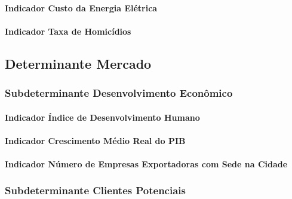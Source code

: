 \documentclass[
  12,
  dvipsnames]{article}
\begin{document}
\hypertarget{indicador-custo-da-energia-eluxe9trica}{%
\paragraph{Indicador Custo da Energia
Elétrica}\label{indicador-custo-da-energia-eluxe9trica}}

\hypertarget{indicador-taxa-de-homicuxeddios}{%
\paragraph{Indicador Taxa de
Homicídios}\label{indicador-taxa-de-homicuxeddios}}

\hypertarget{determinante-mercado}{%
\subsection{Determinante Mercado}\label{determinante-mercado}}

\hypertarget{subdeterminante-desenvolvimento-econuxf4mico}{%
\subsubsection{Subdeterminante Desenvolvimento
Econômico}\label{subdeterminante-desenvolvimento-econuxf4mico}}

\hypertarget{indicador-uxedndice-de-desenvolvimento-humano}{%
\paragraph{Indicador Índice de Desenvolvimento
Humano}\label{indicador-uxedndice-de-desenvolvimento-humano}}

\hypertarget{indicador-crescimento-muxe9dio-real-do-pib}{%
\paragraph{Indicador Crescimento Médio Real do
PIB}\label{indicador-crescimento-muxe9dio-real-do-pib}}

\hypertarget{indicador-nuxfamero-de-empresas-exportadoras-com-sede-na-cidade}{%
\paragraph{Indicador Número de Empresas Exportadoras com Sede na
Cidade}\label{indicador-nuxfamero-de-empresas-exportadoras-com-sede-na-cidade}}

\hypertarget{subdeterminante-clientes-potenciais}{%
\subsubsection{Subdeterminante Clientes
Potenciais}\label{subdeterminante-clientes-potenciais}}
\end{document}
